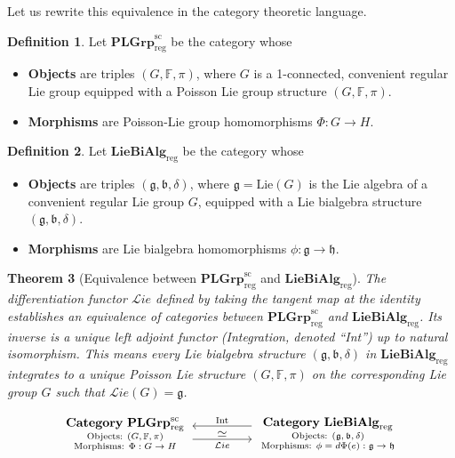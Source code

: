 \documentclass[11pt,reqno]{amsart}
\newtheorem{theorem}{Theorem}[section]
\theoremstyle{definition}
\newtheorem{definition}[theorem]{Definition}
\newcommand{\CatPL}{\mathbf{PLGrp}_{\text{reg}}^{\text{sc}}}
\newcommand{\CatLB}{\mathbf{LieBiAlg}_{\text{reg}}}
\numberwithin{equation}{section}
\begin{document}
Let us rewrite this equivalence in the category theoretic language.  
\begin{definition}
Let $\CatPL$ be the category whose
\begin{itemize}
    \item \textbf{Objects} are triples $(G, \mathbb{F}, \pi)$, where $G$ is a 1-connected, convenient regular Lie group equipped with a Poisson Lie group structure $(G, \mathbb{F}, \pi)$.
    \item \textbf{Morphisms} are Poisson-Lie group homomorphisms $\Phi: G \to H$.
\end{itemize}
\end{definition}


\begin{definition}
Let $\CatLB$ be the category whose
\begin{itemize}
    \item \textbf{Objects} are triples $(\mathfrak{g}, \mathfrak{b}, \delta)$, where $\mathfrak{g} = \text{Lie}(G)$ is the Lie algebra of a convenient regular Lie group $G$, equipped with a  Lie bialgebra structure $(\mathfrak{g}, \mathfrak{b}, \delta)$.
    \item \textbf{Morphisms} are Lie bialgebra homomorphisms $\phi: \mathfrak{g} \to \mathfrak{h}$.
\end{itemize}
\end{definition}

\begin{theorem}[Equivalence between $\CatPL$ and $\CatLB$]\label{equivalence}
The differentiation functor $\mathcal{L}ie$ defined by taking the tangent map at the identity establishes an equivalence of categories between $\CatPL$ and $\CatLB$. Its inverse is a unique left adjoint functor (Integration, denoted ``Int'') up to natural isomorphism. This means every Lie bialgebra structure $(\mathfrak{g}, \mathfrak{b}, \delta)$ in $\CatLB$ integrates to a unique Poisson Lie structure $(G, \mathbb{F}, \pi)$ on the corresponding Lie group $G$ such that $\mathcal{L}ie(G)=\mathfrak g$.
\end{theorem}

\[
\begin{tikzcd}[row sep=huge, column sep=huge, ampersand replacement=\&]
    \parbox{3.5cm}{\centering \textbf{Category} $\CatPL$ \\ 
    \scriptsize Objects: $(G, \mathbb{F}, \pi)$ \\ 
    \scriptsize Morphisms: $\Phi: G\to H$}   
    \arrow[r, "\mathcal{L}ie"', shift right=1.0ex] 
    \arrow[r, phantom, "\simeq"]
    \& 
    \parbox{4.0cm}{\centering \textbf{Category} $\CatLB$ \\ 
    \scriptsize Objects: $(\mathfrak{g}, \mathfrak{b}, \delta)$ \\ 
    \scriptsize Morphisms: $\phi = d\Phi(e):\mathfrak g \to \mathfrak h$}
    \arrow[l, "\text{Int}"', shift right=1.5ex]
\end{tikzcd}
\]
\end{document}
